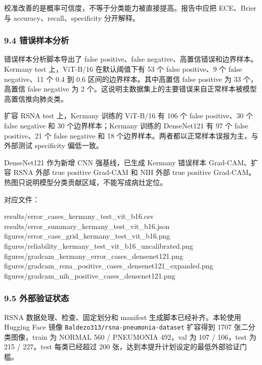 \documentclass[
]{ctexart}
\newenvironment{Shaded}{}{}
\newcommand{\NormalTok}[1]{#1}
\begin{document}
校准改善的是概率可信度，不等于分类能力被直接提高。报告中应把 ECE、Brier
与 accuracy、recall、specificity 分开解释。

\hypertarget{a.4-ux9519ux8befux6837ux672cux5206ux6790}{%
\subsubsection{9.4
错误样本分析}\label{a.4-ux9519ux8befux6837ux672cux5206ux6790}}

错误样本分析脚本导出了 false positive、false
negative、高置信错误和边界样本。Kermany test 上，ViT-B/16 在默认阈值下有
53 个 false positive、9 个 false negative、11 个 0.4 到 0.6
区间的边界样本。其中高置信 false positive 为 33 个，高置信 false
negative 为 2
个。这说明主数据集上的主要错误来自正常样本被模型高置信推向肺炎类。

扩容 RSNA test 上，Kermany 训练的 ViT-B/16 有 106 个 false positive、30
个 false negative 和 30 个边界样本；Kermany 训练的 DenseNet121 有 97 个
false positive、21 个 false negative 和 18
个边界样本。两者都以正常样本误报为主，与外部测试 specificity 偏低一致。

DenseNet121 作为新增 CNN 强基线，已生成 Kermany 错误样本 Grad-CAM、扩容
RSNA 外部 true positive Grad-CAM 和 NIH 外部 true positive
Grad-CAM。热图只说明模型分类贡献区域，不能写成病灶定位。

对应文件：

\begin{Shaded}
\begin{Highlighting}[]
\NormalTok{results/error\_cases\_kermany\_test\_vit\_b16.csv}
\NormalTok{results/error\_summary\_kermany\_test\_vit\_b16.json}
\NormalTok{figures/error\_case\_grid\_kermany\_test\_vit\_b16.png}
\NormalTok{figures/reliability\_kermany\_test\_vit\_b16\_uncalibrated.png}
\NormalTok{figures/gradcam\_kermany\_error\_cases\_densenet121.png}
\NormalTok{figures/gradcam\_rsna\_positive\_cases\_densenet121\_expanded.png}
\NormalTok{figures/gradcam\_nih\_positive\_cases\_densenet121.png}
\end{Highlighting}
\end{Shaded}

\hypertarget{a.5-ux5916ux90e8ux9a8cux8bc1ux72b6ux6001}{%
\subsubsection{9.5
外部验证状态}\label{a.5-ux5916ux90e8ux9a8cux8bc1ux72b6ux6001}}

RSNA 数据处理、检查、固定划分和 manifest 生成脚本已经补齐。本轮使用
Hugging Face 镜像 \texttt{Baldezo313/rsna-pneumonia-dataset} 扩容得到
1707 张二分类图像，train 为 NORMAL 560 / PNEUMONIA 492，val 为 107 /
106，test 为 215 / 227。test 每类已经超过 200
张，达到本提升计划设定的最低外部验证门槛。
\end{document}
